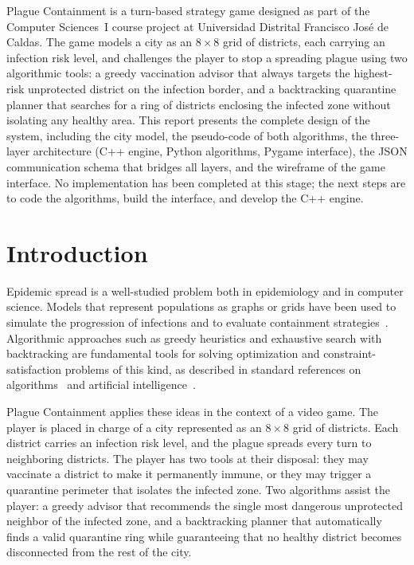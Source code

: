 \documentclass[12pt, a4paper]{article}
\begin{document}
Plague Containment is a turn-based strategy game designed as part of the
Computer Sciences~I course project at Universidad Distrital Francisco
Jos\'{e} de Caldas. The game models a city as an $8\times8$ grid of
districts, each carrying an infection risk level, and challenges the player
to stop a spreading plague using two algorithmic tools: a greedy vaccination
advisor that always targets the highest-risk unprotected district on the
infection border, and a backtracking quarantine planner that searches for a
ring of districts enclosing the infected zone without isolating any healthy
area. This report presents the complete design of the system, including the
city model, the pseudo-code of both algorithms, the three-layer architecture
(C++ engine, Python algorithms, Pygame interface), the JSON communication
schema that bridges all layers, and the wireframe of the game interface. No
implementation has been completed at this stage; the next steps are to code
the algorithms, build the interface, and develop the C++ engine.

\newpage
\section{Introduction}

Epidemic spread is a well-studied problem both in epidemiology and in
computer science. Models that represent populations as graphs or grids have
been used to simulate the progression of infections and to evaluate
containment strategies~\cite{pastor2015epidemic}. Algorithmic approaches
such as greedy heuristics and exhaustive search with backtracking are
fundamental tools for solving optimization and constraint-satisfaction
problems of this kind, as described in standard references on
algorithms~\cite{cormen2009introduction} and artificial
intelligence~\cite{russell2020artificial}.

Plague Containment applies these ideas in the context of a video game.
The player is placed in charge of a city represented as an $8\times8$ grid
of districts. Each district carries an infection risk level, and the plague
spreads every turn to neighboring districts. The player has two tools at
their disposal: they may vaccinate a district to make it permanently immune,
or they may trigger a quarantine perimeter that isolates the infected zone.
Two algorithms assist the player: a greedy advisor that recommends the
single most dangerous unprotected neighbor of the infected zone, and a
backtracking planner that automatically finds a valid quarantine ring while
guaranteeing that no healthy district becomes disconnected from the rest of
the city.
\end{document}
